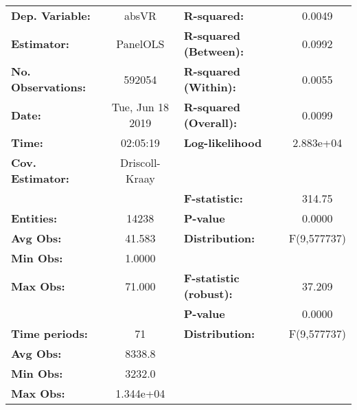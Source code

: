 \begin{center}
\begin{tabular}{lclc}
\toprule
\textbf{Dep. Variable:}                 &       absVR        & \textbf{  R-squared:         }   &      0.0049      \\
\textbf{Estimator:}                     &      PanelOLS      & \textbf{  R-squared (Between):}  &      0.0992      \\
\textbf{No. Observations:}              &       592054       & \textbf{  R-squared (Within):}   &      0.0055      \\
\textbf{Date:}                          &  Tue, Jun 18 2019  & \textbf{  R-squared (Overall):}  &      0.0099      \\
\textbf{Time:}                          &      02:05:19      & \textbf{  Log-likelihood     }   &    2.883e+04     \\
\textbf{Cov. Estimator:}                &   Driscoll-Kraay   & \textbf{                     }   &                  \\
\textbf{}                               &                    & \textbf{  F-statistic:       }   &      314.75      \\
\textbf{Entities:}                      &       14238        & \textbf{  P-value            }   &      0.0000      \\
\textbf{Avg Obs:}                       &       41.583       & \textbf{  Distribution:      }   &   F(9,577737)    \\
\textbf{Min Obs:}                       &       1.0000       & \textbf{                     }   &                  \\
\textbf{Max Obs:}                       &       71.000       & \textbf{  F-statistic (robust):} &      37.209      \\
\textbf{}                               &                    & \textbf{  P-value            }   &      0.0000      \\
\textbf{Time periods:}                  &         71         & \textbf{  Distribution:      }   &   F(9,577737)    \\
\textbf{Avg Obs:}                       &       8338.8       & \textbf{                     }   &                  \\
\textbf{Min Obs:}                       &       3232.0       & \textbf{                     }   &                  \\
\textbf{Max Obs:}                       &     1.344e+04      & \textbf{                     }   &                  \\

\end{tabular}
\end{center}
